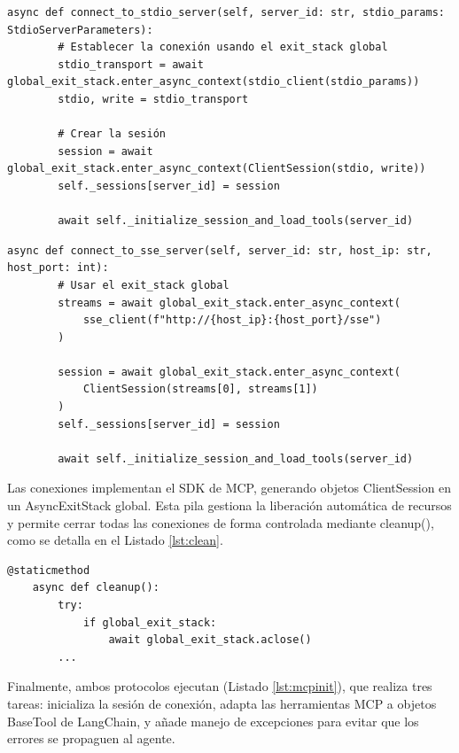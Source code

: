 \begin{lstlisting}[caption={\protect\opus{mcp_multi_client.py}: función \protect\opus{connect_to_stdio_server} en el cliente MCP},label={lst:mcpstdio}]
    async def connect_to_stdio_server(self, server_id: str, stdio_params: StdioServerParameters):
        # Establecer la conexión usando el exit_stack global
        stdio_transport = await global_exit_stack.enter_async_context(stdio_client(stdio_params))
        stdio, write = stdio_transport

        # Crear la sesión
        session = await global_exit_stack.enter_async_context(ClientSession(stdio, write))
        self._sessions[server_id] = session

        await self._initialize_session_and_load_tools(server_id)
\end{lstlisting}

\begin{lstlisting}[caption={\protect\opus{mcp_multi_client.py}: función \protect\opus{connect_to_sse_server} en el cliente MCP},label={lst:mcpsse}]
    async def connect_to_sse_server(self, server_id: str, host_ip: str, host_port: int):
        # Usar el exit_stack global
        streams = await global_exit_stack.enter_async_context(
            sse_client(f"http://{host_ip}:{host_port}/sse")
        )

        session = await global_exit_stack.enter_async_context(
            ClientSession(streams[0], streams[1])
        )
        self._sessions[server_id] = session

        await self._initialize_session_and_load_tools(server_id)
\end{lstlisting}

Las conexiones implementan el SDK de MCP, generando objetos ClientSession en un AsyncExitStack global. Esta pila gestiona la liberación automática de recursos y permite cerrar todas las conexiones de forma controlada mediante cleanup(), como se detalla en el Listado \ref{lst:clean}.

\begin{lstlisting}[caption={\protect\opus{mcp_multi_client.py}: función \protect\opus{cleanup()} en el cliente MCP},label={lst:clean}]
    @staticmethod
    async def cleanup():
        try:
            if global_exit_stack:
                await global_exit_stack.aclose()
        ...

\end{lstlisting}

Finalmente, ambos protocolos ejecutan  (Listado \ref{lst:mcpinit}), que realiza tres tareas: inicializa la sesión de conexión, adapta las herramientas MCP a objetos BaseTool de LangChain, y añade manejo de excepciones para evitar que los errores se propaguen al agente.

